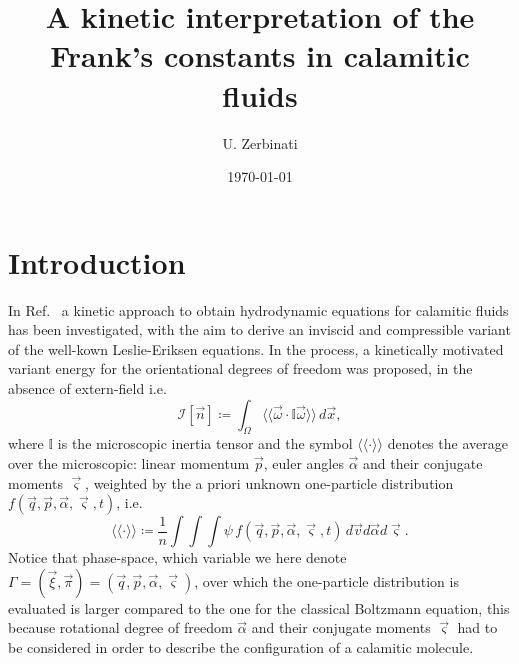 \documentclass[%
 aip,
 amsmath,amssymb,
 reprint,%
]{revtex4-1}
\newcommand{\cchevrons}[1]{\langle\!\langle #1 \rangle\!\rangle}
\begin{document}

\title[]{A kinetic interpretation of the Frank's constants in calamitic fluids}
\author{U. Zerbinati}

\date{\today}%

\begin{abstract}
\end{abstract}

\maketitle

\section{\label{sec:intro}Introduction}
In Ref.~ a kinetic approach to obtain hydrodynamic equations for calamitic fluids has been investigated, with the aim to derive an inviscid and compressible variant of the well-kown Leslie-Eriksen equations.
In the process, a kinetically motivated variant energy for the orientational degrees of freedom was proposed, in the absence of extern-field i.e.
\begin{equation}
\label{eq:OseenFrankGen}
\mathcal{I}[\vec{n}]\coloneqq \int_{\Omega} \cchevrons{\vec{\omega} \cdot \mathbb{I}\vec{\omega}}\,d\vec{x},
\end{equation}
where $\mathbb{I}$ is the microscopic inertia tensor and the symbol $\cchevrons{\cdot}$ denotes the average over the microscopic: linear momentum $\vec{p}$, euler angles $\vec{\alpha}$ and their conjugate moments $\vec{\varsigma}$, weighted by the a priori unknown one-particle distribution $f(\vec{q},\vec{p},\vec{\alpha},\vec{\varsigma},t)$, i.e.~
\begin{equation}
	\cchevrons{\cdot} \coloneqq \frac{1}{n}\int\!\!\!\int\!\!\!\int\psi\,f({\vec{q}},\vec{p},\vec{\alpha},\vec{\varsigma},t)\,d\vec{v}d\vec{\alpha}d\vec{\varsigma}.
\end{equation}
Notice that phase-space, which variable we here denote $\Gamma=(\vec{\xi},\vec{\pi})=(\vec{q},\vec{p},\vec{\alpha},\vec{\varsigma})$, over which the one-particle distribution is evaluated is larger compared to the one for the classical Boltzmann equation, this because rotational degree of freedom $\vec{\alpha}$ and their conjugate moments $\vec{\varsigma}$ had to be considered in order to describe the configuration of a calamitic molecule.
\end{document}
